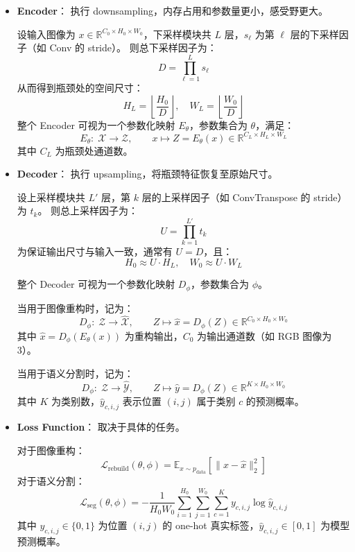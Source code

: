 \begin{itemize}
\item
  \textbf{Encoder}： 执行
  downsampling，内存占用和参数量更小，感受野更大。

  设输入图像为
  \(x\in\mathbb{R}^{C_0\times H_0\times W_0}\)，下采样模块共 \(L\)
  层，\(s_\ell\) 为第 \(\ell\) 层的下采样因子（如 Conv 的 stride）。
  则总下采样因子为： \[
    D=\prod_{\ell=1}^L s_\ell
    \] 从而得到瓶颈处的空间尺寸： \[
    H_L=\left\lfloor\frac{H_0}{D}\right\rfloor,\quad
    W_L=\left\lfloor\frac{W_0}{D}\right\rfloor
    \] 整个 Encoder 可视为一个参数化映射 \(E_\theta\)，参数集合为
  \(\theta\)，满足： \[
    E_\theta:\; \mathcal{X}\to\mathcal{Z},\qquad
    x\mapsto Z=E_\theta(x)\in\mathbb{R}^{C_L\times H_L\times W_L}
    \] 其中 \(C_L\) 为瓶颈处通道数。
\item
  \textbf{Decoder}： 执行 upsampling，将瓶颈特征恢复至原始尺寸。

  设上采样模块共 \(L'\) 层，第 \(k\) 层的上采样因子（如 ConvTranspose 的
  stride）为 \(t_k\)。 则总上采样因子为： \[
    U = \prod_{k=1}^{L'} t_k
    \] 为保证输出尺寸与输入一致，通常有 \(U = D\)，且： \[
    H_0 \approx U \cdot H_L,\quad
    W_0 \approx U \cdot W_L
    \]

  整个 Decoder 可视为一个参数化映射 \(D_\phi\)，参数集合为 \(\phi\)。

  当用于图像重构时，记为： \[
    D_\phi:\; \mathcal{Z} \to \hat{\mathcal{X}},\qquad
    Z \mapsto \hat{x} = D_\phi(Z) \in \mathbb{R}^{C_0 \times H_0 \times W_0}
    \] 其中 \(\hat{x} = D_\phi(E_\theta(x))\) 为重构输出，\(C_0\)
  为输出通道数（如 RGB 图像为 3）。

  当用于语义分割时，记为： \[
    D_\phi:\; \mathcal{Z} \to \hat{\mathcal{Y}},\qquad
    Z \mapsto \hat{y} = D_\phi(Z) \in \mathbb{R}^{K \times H_0 \times W_0}
    \] 其中 \(K\) 为类别数，\(\hat{y}_{c,i,j}\) 表示位置 \((i,j)\)
  属于类别 \(c\) 的预测概率。
\item
  \textbf{Loss Function}： 取决于具体的任务。

  对于图像重构： \[
    \mathcal{L}_{\text{rebuild}}(\theta,\phi)
    = \mathbb{E}_{x \sim p_{\text{data}}}\left[ \| x - \hat{x} \|_2^2 \right]
    \] 对于语义分割： \[
    \mathcal{L}_{\text{seg}}(\theta,\phi)
    = -\frac{1}{H_0 W_0} \sum_{i=1}^{H_0} \sum_{j=1}^{W_0} \sum_{c=1}^{K} y_{c,i,j} \log \hat{y}_{c,i,j}
    \] 其中 \(y_{c,i,j} \in \{0,1\}\) 为位置 \((i,j)\) 的 one-hot
  真实标签，\(\hat{y}_{c,i,j} \in [0,1]\) 为模型预测概率。
\end{itemize}

